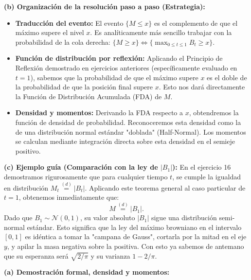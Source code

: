 \documentclass[11pt, letterpaper]{article}
\begin{document}
\begin{solucion}
    \textbf{(b) Organización de la resolución paso a paso (Estrategia):}
    \begin{itemize}
        \item[(i)] \textbf{Traducción del evento:} El evento $\{M \le x\}$ es el complemento de que el máximo supere el nivel $x$. Es analíticamente más sencillo trabajar con la probabilidad de la cola derecha: $\{M \ge x\} \iff \{\max_{0 \le t \le 1} B_t \ge x\}$.
        \item[(ii)] \textbf{Función de distribución por reflexión:} Aplicando el Principio de Reflexión demostrado en ejercicios anteriores (específicamente evaluado en $t=1$), sabemos que la probabilidad de que el máximo supere $x$ es el doble de la probabilidad de que la posición final supere $x$. Esto nos dará directamente la Función de Distribución Acumulada (FDA) de $M$.
        \item[(iii)] \textbf{Densidad y momentos:} Derivando la FDA respecto a $x$, obtendremos la función de densidad de probabilidad. Reconoceremos esta densidad como la de una distribución normal estándar "doblada" (Half-Normal). Los momentos se calculan mediante integración directa sobre esta densidad en el semieje positivo.
    \end{itemize}

    \vspace{3mm}
    \textbf{(c) Ejemplo guía (Comparación con la ley de $|B_1|$):}
    En el ejercicio 16 demostramos rigurosamente que para cualquier tiempo $t$, se cumple la igualdad en distribución $M_t \stackrel{(d)}{=} |B_t|$. 
    Aplicando este teorema general al caso particular de $t=1$, obtenemos inmediatamente que:
    \[ M \stackrel{(d)}{=} |B_1|. \]
    Dado que $B_1 \sim \mathcal{N}(0, 1)$, su valor absoluto $|B_1|$ sigue una distribución semi-normal estándar. Esto significa que la ley del máximo browniano en el intervalo $[0,1]$ es idéntica a tomar la "campana de Gauss", cortarla por la mitad en el eje $y$, y apilar la masa negativa sobre la positiva. Con esto ya sabemos de antemano que su esperanza será $\sqrt{2/\pi}$ y su varianza $1 - 2/\pi$.

    \vspace{3mm}
    \textbf{(a) Demostración formal, densidad y momentos:}


\end{solucion}
\end{document}
